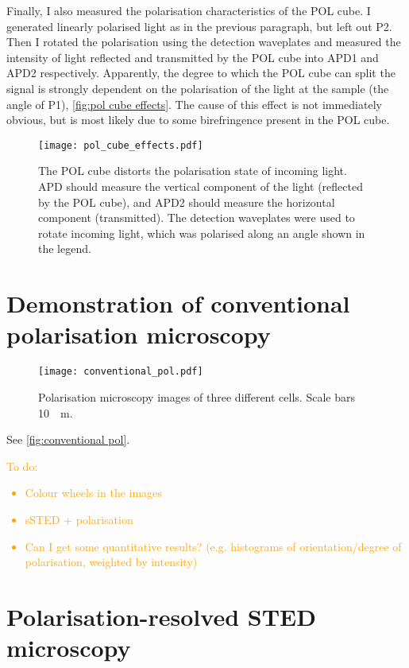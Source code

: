 Finally, I also measured the polarisation characteristics of the POL cube. I generated linearly polarised light as in the previous paragraph, but left out P2. Then I rotated the polarisation using the detection waveplates and measured the intensity of light reflected and transmitted by the POL cube into APD1 and APD2 respectively. Apparently, the degree to which the POL cube can split the signal is strongly dependent on the polarisation of the light at the sample (the angle of P1), \autoref{fig:pol cube effects}. The cause of this effect is not immediately obvious, but is most likely due to some birefringence present in the POL cube. 

\begin{figure}
	\centering
	\texttt{[image: pol\_cube\_effects.pdf]}
	\caption{The POL cube distorts the polarisation state of incoming light. APD should measure the vertical component of the light (reflected by the POL cube), and APD2 should measure the horizontal component (transmitted). The detection waveplates were used to rotate incoming light, which was polarised along an angle shown in the legend.}
	\label{fig:pol cube effects}
\end{figure}

\section{Demonstration of conventional polarisation microscopy}

\begin{figure}
	\centering
	\texttt{[image: conventional\_pol.pdf]}
	\caption{
		Polarisation microscopy images of three different cells. Scale bars \SI{10}{\mu m}.
	}
	\label{fig:conventional pol}
\end{figure}

See \autoref{fig:conventional pol}.
\textcolor{orange}{
	To do:
	\begin{itemize}
		\item Colour wheels in the images
		\item sSTED + polarisation
		\item Can I get some quantitative results? (e.g. histograms of orientation/degree of polarisation, weighted by intensity)
	\end{itemize}
} 

\section{Polarisation-resolved STED microscopy}

